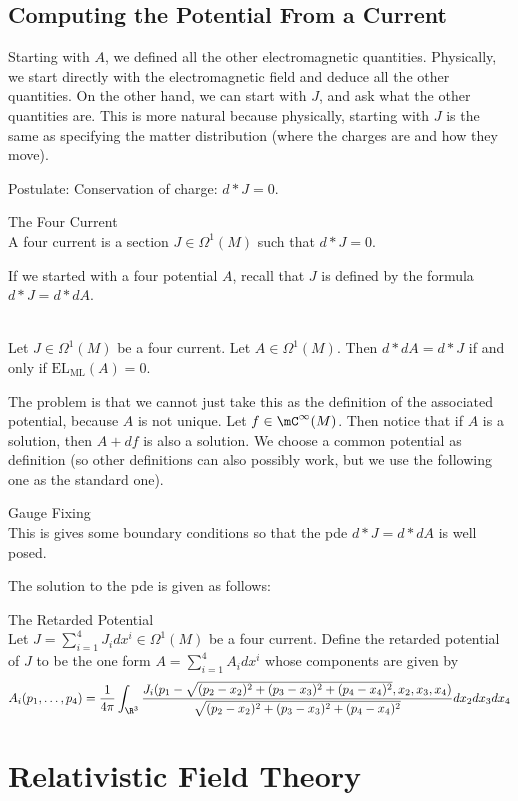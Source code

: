 \documentclass[a4paper]{article}
\begin{document}
\subsection{Computing the Potential From a Current}
Starting with $A$, we defined all the other electromagnetic quantities. Physically, we start directly with the electromagnetic field and deduce all the other quantities. On the other hand, we can start with $J$, and ask what the other quantities are. This is more natural because physically, starting with $J$ is the same as specifying the matter distribution (where the charges are and how they move). 

Postulate: Conservation of charge: $d\ast J=0$. 

\begin{defn}{The Four Current}{}\\
A four current is a section $J\in\Omega^1(M)$ such that $d\ast J=0$. 
\end{defn}

If we started with a four potential $A$, recall that $J$ is defined by the formula $d\ast J=d\ast dA$. 

\begin{prp}{}{}\\
Let $J\in\Omega^1(M)$ be a four current. Let $A\in\Omega^1(M)$. Then $d\ast dA=d\ast J$ if and only if $\text{EL}_\text{ML}(A)=0$. 
\end{prp}

The problem is that we cannot just take this as the definition of the associated potential, because $A$ is not unique. Let $f\in\mC^\infty(M)$. Then notice that if $A$ is a solution, then $A+df$ is also a solution. We choose a common potential as definition (so other definitions can also possibly work, but we use the following one as the standard one). 

\begin{defn}{Gauge Fixing}{}\\
This is gives some boundary conditions so that the pde $d\ast J=d\ast dA$ is well posed. 
\end{defn}

The solution to the pde is given as follows: 

\begin{defn}{The Retarded Potential}{}\\
Let $J=\sum_{i=1}^4J_idx^i\in\Omega^1(M)$ be a four current. Define the retarded potential of $J$ to be the one form $A=\sum_{i=1}^4A_idx^i$ whose components are given by $$A_i(p_1,\dots,p_4)=\frac{1}{4\pi}\int_{\R^3}\frac{J_i(p_1-\sqrt{(p_2-x_2)^2+(p_3-x_3)^2+(p_4-x_4)^2},x_2,x_3,x_4)}{\sqrt{(p_2-x_2)^2+(p_3-x_3)^2+(p_4-x_4)^2}}dx_2dx_3dx_4$$
\end{defn}

\pagebreak
\section{Relativistic Field Theory}
\end{document}

